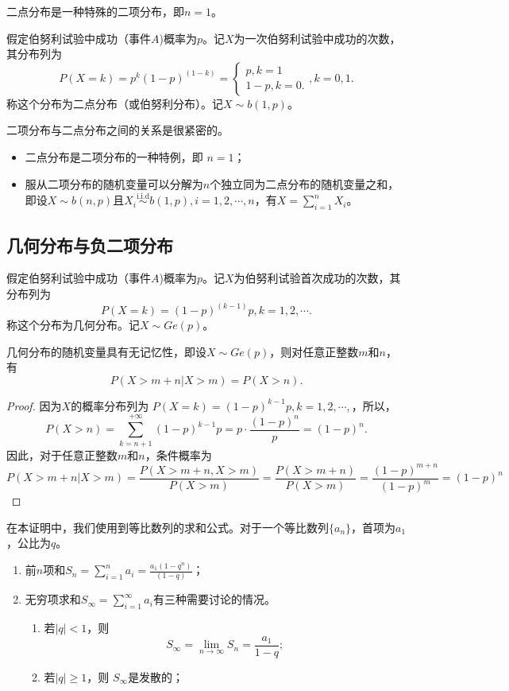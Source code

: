  二点分布是一种特殊的二项分布，即$n=1$。
 \begin{definition}\label{def:two_point_dist}
假定伯努利试验中成功（事件$A$)概率为$p$。记$X$为一次伯努利试验中成功的次数，其分布列为
$$
P(X=k) =  p^k (1-p)^{(1-k)} = \left\{
\begin{aligned}
    p, k=1\\ 1-p , k=0.
\end{aligned}\right., k=0,1.
$$
称这个分布为二点分布（或伯努利分布）。记$X\sim b(1,p)$。
\end{definition}
\begin{remark}
二项分布与二点分布之间的关系是很紧密的。
\begin{itemize}
    \item 二点分布是二项分布的一种特例，即 $n=1$；
    \item 服从二项分布的随机变量可以分解为$n$个独立同为二点分布的随机变量之和，即设$X\sim b(n,p)$且$X_i \overset{\text{i.i.d}}{\sim} b(1,p),i=1,2,\cdots,n$，有$X=\sum_{i=1}^n X_i$。
\end{itemize}
\end{remark}


\subsection{几何分布与负二项分布}
\begin{definition}\label{def:geometry_dist}
假定伯努利试验中成功（事件$A$)概率为$p$。记$X$为伯努利试验首次成功的次数，其分布列为
$$
P(X=k) =   (1-p)^{(k-1)}p, k=1,2,\cdots.
$$
称这个分布为几何分布。记$X\sim Ge(p)$。
\end{definition}
\begin{theorem}
几何分布的随机变量具有无记忆性，即设$X \sim Ge(p)$，则对任意正整数$m$和$n$，有  
$$P(X>m+n|X>m)=P(X>n).$$
\end{theorem}

\begin{proof}
	因为$X$的概率分布列为
	$P(X= k) = (1-p)^{k-1} p , k=1,2,\cdots,$，所以，
		 $$P(X>n)=\sum_{k=n+1}^{+\infty } (1-p)^{k-1} p=p\cdot \frac{(1-p)^{n} }{p} =(1-p)^{n}. $$
	因此，对于任意正整数$m$和$n$，条件概率为
	$$P(X>m+n|X>m)=\frac{P(X>m+n,X>m)}{P(X>m)} =\frac{P(X>m+n)}{P(X>m)}=\frac{(1-p)^{m+n} }{(1-p)^{m} }=(1-p)^{n}$$
	\end{proof}
  \begin{remark}
 在本证明中，我们使用到等比数列的求和公式。对于一个等比数列$\{a_n\}$，首项为$a_1$，公比为$q$。
 \begin{enumerate}
     \item 前$n$项和$S_n = \sum_{i=1}^n a_i =  \frac{a_1 ( 1- q^n)}{(1-q)}$；
     \item 无穷项求和$S_\infty = \sum_{i=1}^\infty a_i$有三种需要讨论的情况。
     \begin{enumerate}
         \item 若$|q|<1$，则
         $$
         S_\infty = \lim_{n\rightarrow \infty} S_n = \frac{a_1}{1-q};
         $$
         \item 若$|q| \geq 1$，则
         $S_\infty$是发散的；
     \end{enumerate}
 \end{enumerate}
 \end{remark}

